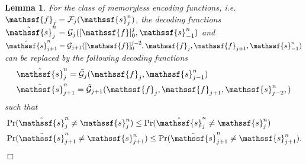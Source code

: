 \documentclass[journal, twocolumn, 10pt]{IEEEtran}
\newtheorem{lemma}{Lemma}
\newcommand{\cF}{{\mathcal{F}}}
\newcommand{\cG}{{\mathcal{G}}}
\newcommand{\rvf}{{\mathssf{f}}}    %
\newcommand{\rvs}{{\mathssf{s}}}    %
\begin{document}
{
\begin{lemma}
\label{lem:memoryless}
For the class of memoryless encoding functions, i.e. $\rvf_j = \cF_j(\rvs_j^n)$, 
the decoding functions 
$\hat{\rvs}_j^n = {\cG}_{j}([\rvf]_0^j,\rvs_{-1}^n)$ and $\hat{\rvs}_{j+1}^n = {\cG}_{j+1}([\rvf]_0^{j-2}, \rvf_j, \rvf_{j+1},\rvs_{-1}^n)$
can be replaced by the following decoding functions
\begin{align}
&\tilde{\rvs}_j^n = \tilde{\cG}_{j}(\rvf_j,\rvs_{j-1}^n) \label{eq:Fano2a}\\
&\tilde{\rvs}_{j+1}^n = \tilde{\cG}_{j+1}( \rvf_j ,\rvf_{j+1}, \rvs^n_{j-2},) \label{eq:Fano1a}
\end{align} such that
\begin{align}
&\Pr(\tilde{\rvs}_j^n \neq \rvs_j^n) \le \Pr(\hat{\rvs}_j^n \neq \rvs_j^n)\\
&\Pr(\tilde{\rvs}_{j+1}^n \neq \rvs_{j+1}^n) \le \Pr(\hat{\rvs}_{j+1}^n \neq \rvs_{j+1}^n)  \label{eq:ErPr}.
\end{align} \hfill$\Box$
\end{lemma}

}
\end{document}
